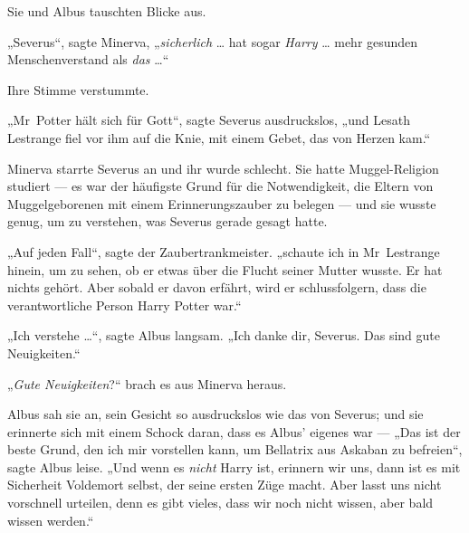 Sie und Albus tauschten Blicke aus.

„Severus“, sagte Minerva,
„\emph{sicherlich} … hat sogar \emph{Harry} … mehr gesunden Menschenverstand als \emph{das} …“

Ihre Stimme verstummte.

„Mr~Potter hält sich für Gott“, sagte Severus ausdruckslos, „und Lesath Lestrange fiel vor ihm auf die Knie, mit einem Gebet, das von Herzen kam.“

Minerva starrte Severus an und ihr wurde schlecht. Sie hatte Muggel-Religion studiert — es war der häufigste Grund für die Notwendigkeit, die Eltern von Muggelgeborenen mit einem Erinnerungszauber zu belegen — und sie wusste genug, um zu verstehen, was Severus gerade gesagt hatte.

„Auf jeden Fall“, sagte der Zaubertrankmeister. „schaute ich in Mr~Lestrange hinein, um zu sehen, ob er etwas über die Flucht seiner Mutter wusste. Er hat nichts gehört. Aber sobald er davon erfährt, wird er schlussfolgern, dass die verantwortliche Person Harry Potter war.“

„Ich verstehe …“, sagte Albus langsam.
„Ich danke dir, Severus. Das sind gute Neuigkeiten.“

„\emph{Gute Neuigkeiten}?“ brach es aus Minerva heraus.

Albus sah sie an, sein Gesicht so ausdruckslos wie das von Severus; und sie erinnerte sich mit einem Schock daran, dass es Albus’ eigenes war —
„Das ist der beste Grund, den ich mir vorstellen kann, um Bellatrix aus Askaban zu befreien“, sagte Albus leise.
„Und wenn es \emph{nicht} Harry ist, erinnern wir uns, dann ist es mit Sicherheit Voldemort selbst, der seine ersten Züge macht. Aber lasst uns nicht vorschnell urteilen, denn es gibt vieles, dass wir noch nicht wissen, aber bald wissen werden.“


